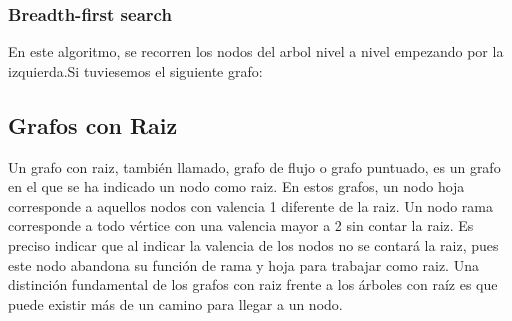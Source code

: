\documentclass[11pt]{article}
\theoremstyle{plain}
\begin{document}
            \subsubsection{Breadth-first search} %
            \label{subsub:breadth_first_search}
                En este algoritmo, se recorren los nodos del arbol nivel a nivel empezando por la izquierda.Si tuviesemos el siguiente grafo:\\
                \begin{center}
                \end{center}
                
        \subsection{Grafos con Raiz} %
        \label{sub:grafos_con_raiz}
            Un grafo con raiz, también llamado, grafo de flujo o grafo puntuado, es un grafo en el que se ha indicado un nodo como raiz. En estos grafos, un nodo hoja corresponde a aquellos nodos con valencia 1 diferente de la raiz. Un nodo rama corresponde a todo vértice con una valencia mayor a 2 sin contar la raiz. Es preciso indicar que al indicar la valencia de los nodos no se contará la raiz, pues este nodo abandona su función de rama y hoja para trabajar como raiz. Una distinción fundamental de los grafos con raiz frente a los árboles con raíz es que puede existir más de un camino para llegar a un nodo.\\
\end{document}
